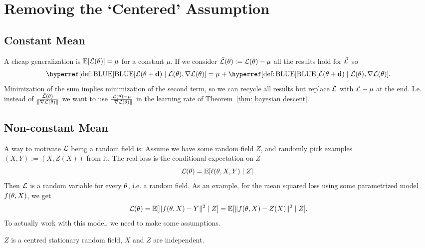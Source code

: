 \section{Removing the `Centered' Assumption}

\subsection{Constant Mean}\label{subsec: constant mean}

A cheap generalization is \(\mathbb{E}[\mathcal{L}(\theta)]=\mu\) for a constant \(\mu\).
If we consider \(\bar{\mathcal{L}}(\theta):=\mathcal{L}(\theta) - \mu\) all the results
hold for \(\bar{\mathcal{L}}\) so
\begin{equation*}
	\BLUE[\Loss(\param+\step) \mid \Loss(\param), \grad\Loss(\param)]
	= \mu + \BLUE[\bar{\Loss}(\param+\step) \mid \bar{\Loss}(\param), \grad\Loss(\param)].
\end{equation*}
Minimization of the sum implies minimization of the second term, so we can recycle all results
but replace \(\bar{\mathcal{L}}\) with \(\mathcal{L} - \mu\) at the end. I.e. instead of 
\(\frac{\bar{\mathcal{L}}(\theta)}{\|\nabla\mathcal{L}(\theta)\|}\) we want to use
\(\frac{\mathcal{L}(\theta) -\mu}{\|\nabla\mathcal{L}(\theta)\|}\) in the learning rate
of Theorem~\ref{thm: bayesian descent}.

\subsection{Non-constant Mean}

A way to motivate \(\mathcal{L}\) being a random field is: Assume we have some
random field \(Z\), and randomly pick examples
\((X,Y) := (X,Z(X))\) from it. The real loss is the conditional expectation on
\(Z\)
\begin{equation*}
	\mathcal{L}(\theta) = \mathbb{E}[\ell(\theta, X,Y)\mid Z].
\end{equation*}
Then \(\mathcal{L}\) is a random variable for every \(\theta\), i.e. a random field.
As an example, for the mean squared loss using some parametrized model
\(f(\theta, X)\), we get
\begin{equation*}
	\mathcal{L}(\theta)
	= \mathbb{E}[\|f(\theta, X) - Y\|^2 \mid Z]
	= \mathbb{E}[\|f(\theta, X) - Z(X)\|^2 \mid Z].
\end{equation*}
To actually work with this model, we need to make some assumptions.

\begin{axiom}
	\(Z\) is a centred stationary random field, \(X\) and \(Z\) are independent.
\end{axiom}

